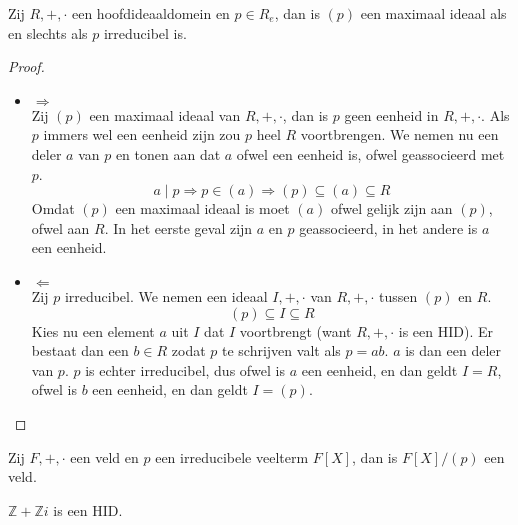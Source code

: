 \documentclass[main.tex]{subfiles}
\begin{document}
\begin{st}
  \label{st:hoofdidiaal-van-irreducibele-veelterm-maximaal}
  Zij $R,+,\cdot$ een hoofdideaaldomein en $p\in R_{e}$, dan is $(p)$ een maximaal ideaal als en slechts als $p$ irreducibel is.

  \begin{proof}
    \begin{itemize}
    \item $\Rightarrow$\\
      Zij $(p)$ een maximaal ideaal van $R,+,\cdot$, dan is $p$ geen eenheid in $R,+,\cdot$.
      Als $p$ immers wel een eenheid zijn zou $p$ heel $R$ voortbrengen. \waarom
      We nemen nu een deler $a$ van $p$ en tonen aan dat $a$ ofwel een eenheid is, ofwel geassocieerd met $p$.
      \[ a \mid p \Rightarrow p \in (a) \Rightarrow (p) \subseteq (a) \subseteq R \]
      \waarom
      Omdat $(p)$ een maximaal ideaal is moet $(a)$ ofwel gelijk zijn aan $(p)$, ofwel aan $R$.
      In het eerste geval zijn $a$ en $p$ geassocieerd, in het andere is $a$ een eenheid.\waarom
    \item $\Leftarrow$\\
      Zij $p$ irreducibel.
      We nemen een ideaal $I,+,\cdot$ van $R,+,\cdot$ tussen $(p)$ en $R$.
      \[ (p) \subseteq I \subseteq R \]
      Kies nu een element $a$ uit $I$ dat $I$ voortbrengt (want $R,+,\cdot$ is een HID).
      Er bestaat dan een $b\in R$ zodat $p$ te schrijven valt als $p=ab$.
      $a$ is dan een deler van $p$.
      $p$ is echter irreducibel, dus ofwel is $a$ een eenheid, en dan geldt $I=R$, ofwel is $b$ een eenheid, en dan geldt $I=(p)$.
    \end{itemize}
  \end{proof}
\end{st}

\begin{gev}
  \label{gev:veld-door-hoofdideaal-van-irreducibele-veelterm-veld}
  Zij $F,+,\cdot$ een veld en $p$ een irreducibele veelterm $F[X]$, dan is $F[X]/(p)$ een veld.
\end{gev}

\begin{st}
  $\mathbb{Z} + \mathbb{Z}i$ is een HID.
  \zb
\end{st}
\end{document}
